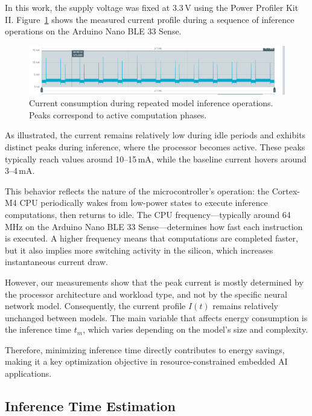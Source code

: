 In this work, the supply voltage was fixed at 3.3\,V using the Power Profiler Kit II. Figure~\ref{fig:current_profile} shows the measured current profile during a sequence of inference operations on the Arduino Nano BLE 33 Sense.

\begin{figure}[H]
    \centering
    \includegraphics[width=\textwidth]{Pictures/Current.png}
    \caption{Current consumption during repeated model inference operations. Peaks correspond to active computation phases.}
    \label{fig:current_profile}
\end{figure}

As illustrated, the current remains relatively low during idle periods and exhibits distinct peaks during inference, where the processor becomes active. These peaks typically reach values around 10–15\,mA, while the baseline current hovers around 3–4\,mA.

This behavior reflects the nature of the microcontroller's operation: the Cortex-M4 CPU periodically wakes from low-power states to execute inference computations, then returns to idle. The CPU frequency—typically around 64\,MHz on the Arduino Nano BLE 33 Sense—determines how fast each instruction is executed. A higher frequency means that computations are completed faster, but it also implies more switching activity in the silicon, which increases instantaneous current draw.

However, our measurements show that the peak current is mostly determined by the processor architecture and workload type, and not by the specific neural network model. Consequently, the current profile \( I(t) \) remains relatively unchanged between models. The main variable that affects energy consumption is the inference time \( t_m \), which varies depending on the model's size and complexity.

Therefore, minimizing inference time directly contributes to energy savings, making it a key optimization objective in resource-constrained embedded AI applications.



\subsection{Inference Time Estimation}

